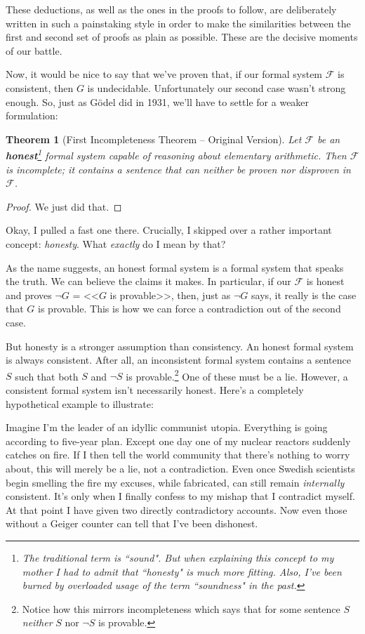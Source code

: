 \documentclass{article}
\theoremstyle{theorem}
\newtheorem{theorem}{Theorem}
\begin{document}
These deductions, as well as the ones in the proofs to follow, are deliberately written in such a painstaking style in order to make the similarities between the first and second set of proofs as plain as possible. These are the decisive moments of our battle.

Now, it would be nice to say that we've proven that, if our formal system $\mathcal{F}$ is consistent, then $G$ is undecidable. Unfortunately our second case wasn't strong enough. So, just as Gödel did in 1931, we'll have to settle for a weaker formulation:

\begin{theorem}[First Incompleteness Theorem -- Original Version]
Let $\mathcal{F}$ be an \textbf{honest}\footnote{The traditional term is ``\textit{sound}". But when explaining this concept to my mother I had to admit that ``honesty" is much more fitting. Also, I've been burned by overloaded usage of the term ``soundness" in the past.} formal system capable of reasoning about elementary arithmetic. Then $\mathcal{F}$ is incomplete; it contains a sentence that can neither be proven nor disproven in $\mathcal{F}$.
\end{theorem}

\begin{proof}
We just did that.
\end{proof}

Okay, I pulled a fast one there. Crucially, I skipped over a rather important concept: \textit{honesty}. What \textit{exactly} do I mean by that?

As the name suggests, an honest formal system is a formal system that speaks the truth. We can believe the claims it makes. In particular, if our $\mathcal{F}$ is honest and proves $\neg G$ = <<$G$ is provable>>, then, just as $\neg G$ says, it really is the case that $G$ is provable. This is how we can force a contradiction out of the second case.

But honesty is a stronger assumption than consistency. An honest formal system is always consistent. After all, an inconsistent formal system contains a sentence $S$ such that both $S$ and $\neg S$ is provable.\footnote{Notice how this mirrors incompleteness which says that for some sentence $S$ \textit{neither} $S$ nor $\neg S$ is provable.} One of these must be a lie. However, a consistent formal system isn't necessarily honest. Here's a completely hypothetical example to illustrate: 

Imagine I'm the leader of an idyllic communist utopia. Everything is going according to five-year plan. Except one day one of my nuclear reactors suddenly catches on fire. If I then tell the world community that there's nothing to worry about, this will merely be a lie, not a contradiction. Even once Swedish scientists begin smelling the fire my excuses, while fabricated, can still remain \textit{internally} consistent. It's only when I finally confess to my mishap that I contradict myself. At that point I have given two directly contradictory accounts. Now even those without a Geiger counter can tell that I've been dishonest.
\end{document}
